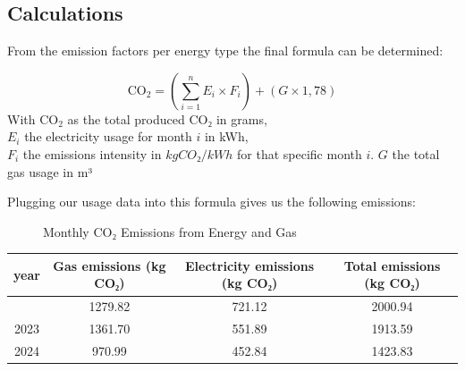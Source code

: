 \documentclass[
  letterpaper,
  DIV=11,
  numbers=noendperiod]{scrartcl}
\begin{document}
\subsection{Calculations}\label{calculations}

From the emission factors per energy type the final formula can be
determined:

\[
\text{CO}_2 = \left( \sum_{i=1}^{n} E_i \times F_i \right) + \left( G \times 1,78 \right)
\] With \(\text{CO}_2\) as the total produced CO₂ in grams,\\
\(E_i\) the electricity usage for month \(i\) in kWh,\\
\(F_i\) the emissions intensity in \(kg CO₂/kWh\) for that specific
month \(i\). \(G\) the total gas usage in m³

Plugging our usage data into this formula gives us the following
emissions:

\label{cell-fig-emissions}
\begin{figure}[H]


\caption{\label{fig-emissions}Monthly CO₂ Emissions from Energy and Gas}

\end{figure}%

\begin{longtable}[]{@{}cccc@{}}
\toprule\noalign{}
year & Gas emissions (kg CO₂) & Electricity emissions (kg CO₂) & Total
emissions (kg CO₂) \\
\midrule\noalign{}
\endhead
\bottomrule\noalign{}
\endlastfoot
2022 & 1279.82 & 721.12 & 2000.94 \\
2023 & 1361.70 & 551.89 & 1913.59 \\
2024 & 970.99 & 452.84 & 1423.83 \\
\end{longtable}
\end{document}
